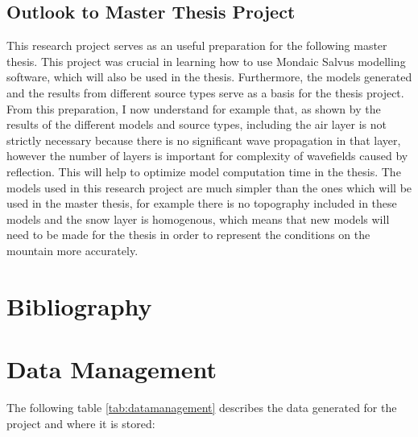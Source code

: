 \documentclass[a4paper,10pt]{article}
\begin{document}
\subsection{Outlook to Master Thesis Project}
\noindent This research project serves as an useful preparation for the following master thesis. This project was crucial in learning how to use Mondaic Salvus modelling software, which will also be used in the thesis. Furthermore, the models generated and the results from different source types serve as a basis for the thesis project. From this preparation, I now understand for example that, as shown by the results of the different models and source types, including the air layer is not strictly necessary because there is no significant wave propagation in that layer, however the number of layers is important for complexity of wavefields caused by reflection. This will help to optimize model computation time in the thesis. The models used in this research project are much simpler than the ones which will be used in the master thesis, for example there is no topography included in these models and the snow layer is homogenous, which means that new models will need to be made for the thesis in order to represent the conditions on the mountain more accurately. 

\newpage
\section{Bibliography} 
\typeout{}
\printbibliography

\newpage
\section{Data Management}
\noindent The following table \ref{tab:datamanagement} describes the data generated for the project and where it is stored:
\end{document}
